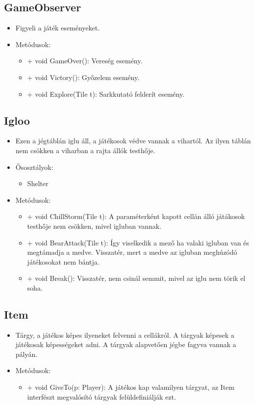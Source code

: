\subsection{GameObserver}
\begin{itemize}
	\item Figyeli a játék eseményeket.
	\item Metódusok:
	\begin{itemize}
		\item + void GameOver(): Vereség esemény.
		\item + void Victory(): Győzelem esemény.
		\item + void Explore(Tile t): Sarkkutató felderít esemény.
	\end{itemize}
\end{itemize}

\subsection{Igloo}
\begin{itemize}
	\item Ezen a jégtáblán iglu áll, a játékosok védve vannak a vihartól. Az ilyen táblán nem csökken a viharban a rajta állók testhője.
	\item Ősosztályok:
	\begin{itemize} 
		\item Shelter
	\end{itemize}
	\item Metódusok:
	\begin{itemize}
		\item + void ChillStorm(Tile t): A paraméterként kapott cellán álló játákosok testhője nem csökken, mivel igluban vannak.
		\item + void BearAttack(Tile t): Így viselkedik a mező ha valaki igluban van és megtámadja a medve. Visszatér, mert a medve az igluban meghúzódó játékosokat nem bántja.
		\item + void Break(): Visszatér, nem csinál semmit, mivel az iglu nem törik el soha.
	\end{itemize}
\end{itemize}

\subsection{Item}
\begin{itemize}
	\item Tárgy, a játékos képes ilyeneket felvenni a cellákról. A tárgyak képesek a játékosak képességeket adni. A tárgyak alapvetően jégbe fagyva vannak a pályán.
	\item Metódusok:
	\begin{itemize}
		\item + void GiveTo(p: Player): A játékos kap valamilyen tárgyat, az Item interfészt megvalósító tárgyak felüldefiniálják ezt.
	\end{itemize}
\end{itemize}

